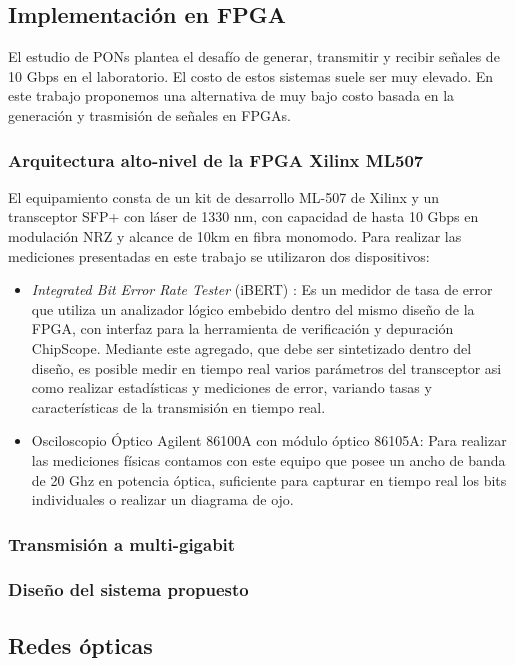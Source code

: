 \documentclass[a4paper,10pt]{report}
\begin{document}
\subsection{Implementación en FPGA}
El estudio de PONs plantea el desafío de generar, transmitir y recibir
señales de 10 Gbps en el laboratorio. El costo de estos sistemas
suele ser muy elevado. En este trabajo proponemos una alternativa de muy
bajo costo basada en la generación y trasmisión de señales en FPGAs.

\subsubsection{Arquitectura alto-nivel de la FPGA Xilinx ML507}
El equipamiento consta de un kit de desarrollo ML-507 de Xilinx y un
transceptor SFP+ con láser de 1330 nm, con capacidad de hasta 10 Gbps
en modulación NRZ y alcance de 10km en fibra monomodo. Para realizar
las mediciones presentadas en este trabajo se utilizaron dos dispositivos:
\begin{itemize}
 \item {\em Integrated Bit Error Rate Tester} (iBERT) \cite{4gtxs}: Es
un medidor de tasa de error que utiliza un analizador lógico embebido dentro
del mismo diseño de la FPGA, con interfaz para la herramienta de
verificación y depuración ChipScope. Mediante este agregado, que debe
ser sintetizado dentro del diseño, es posible medir en tiempo real
varios parámetros del transceptor asi como realizar estadísticas y
mediciones de error, variando tasas y características de la transmisión
en tiempo real.
 \item Osciloscopio Óptico Agilent 86100A con módulo óptico 86105A: Para
realizar las mediciones físicas contamos con este equipo que posee un
ancho de banda de 20 Ghz en potencia óptica, suficiente para capturar en
tiempo real los bits individuales o realizar un diagrama de ojo.
\end{itemize}
\subsubsection{Transmisión a multi-gigabit}
\subsubsection{Diseño del sistema propuesto}
\subsection{Redes ópticas}
\end{document}
